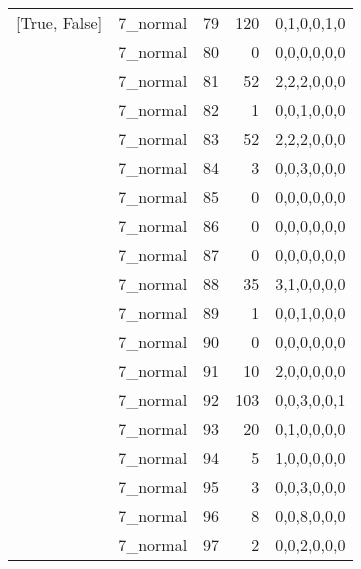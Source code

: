 \begin{tabular}{llrrl}
 [True, False]   & 7\_normal            &            79 &                   120 & 0,1,0,0,1,0   \\
 [True, False]   & 7\_normal            &            80 &                     0 & 0,0,0,0,0,0   \\
 [True, False]   & 7\_normal            &            81 &                    52 & 2,2,2,0,0,0   \\
 [True, False]   & 7\_normal            &            82 &                     1 & 0,0,1,0,0,0   \\
 [True, False]   & 7\_normal            &            83 &                    52 & 2,2,2,0,0,0   \\
 [True, False]   & 7\_normal            &            84 &                     3 & 0,0,3,0,0,0   \\
 [True, False]   & 7\_normal            &            85 &                     0 & 0,0,0,0,0,0   \\
 [True, False]   & 7\_normal            &            86 &                     0 & 0,0,0,0,0,0   \\
 [True, False]   & 7\_normal            &            87 &                     0 & 0,0,0,0,0,0   \\
 [True, False]   & 7\_normal            &            88 &                    35 & 3,1,0,0,0,0   \\
 [True, False]   & 7\_normal            &            89 &                     1 & 0,0,1,0,0,0   \\
 [True, False]   & 7\_normal            &            90 &                     0 & 0,0,0,0,0,0   \\
 [True, False]   & 7\_normal            &            91 &                    10 & 2,0,0,0,0,0   \\
 [True, False]   & 7\_normal            &            92 &                   103 & 0,0,3,0,0,1   \\
 [True, False]   & 7\_normal            &            93 &                    20 & 0,1,0,0,0,0   \\
 [True, False]   & 7\_normal            &            94 &                     5 & 1,0,0,0,0,0   \\
 [True, False]   & 7\_normal            &            95 &                     3 & 0,0,3,0,0,0   \\
 [True, False]   & 7\_normal            &            96 &                     8 & 0,0,8,0,0,0   \\
 [True, False]   & 7\_normal            &            97 &                     2 & 0,0,2,0,0,0   \\

\end{tabular}
